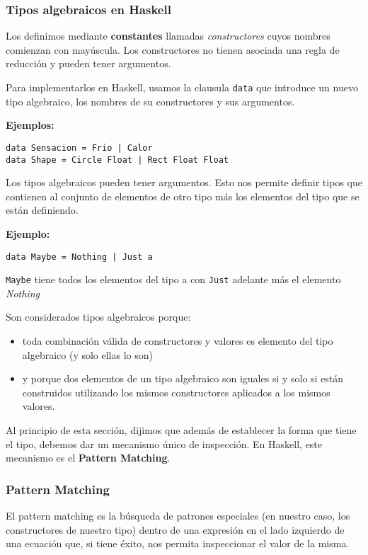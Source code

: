 \subsubsection{Tipos algebraicos en Haskell}
Los definimos mediante \textbf{constantes} llamadas \textit{constructores} cuyos nombres comienzan con mayúscula. Los constructores no tienen asociada una regla de reducción y pueden tener argumentos.

Para implementarlos en Haskell, usamos la clausula \texttt{data} que introduce un nuevo tipo algebraico, los nombres de su constructores y sus argumentos.

\textbf{Ejemplos:}
\begin{centrado}
	\begin{verbatim}
data Sensacion = Frio | Calor
data Shape = Circle Float | Rect Float Float
	\end{verbatim}
\end{centrado}

Los tipos algebraicos pueden tener argumentos. Esto nos permite definir tipos que contienen al conjunto de elementos de otro tipo más los elementos del tipo que se están definiendo.

\textbf{Ejemplo:}
\begin{centrado}
	\begin{verbatim}
data Maybe = Nothing | Just a
	\end{verbatim}
\end{centrado}
\texttt{Maybe} tiene todos los elementos del tipo a con \texttt{Just} adelante más el elemento \textit{Nothing}

\vspace*{5mm}

Son considerados tipos algebraicos porque:
\begin{itemize}
	\item toda combinación válida de constructores y valores es elemento del tipo algebraico (y solo ellas lo son)
	\item y porque dos elementos de un tipo algebraico son iguales si y solo si están construidos utilizando los mismos constructores aplicados a los mismos valores.
\end{itemize}
Al principio de esta sección, dijimos que además de establecer la forma que tiene el tipo, debemos dar un mecanismo único de inspección. En Haskell, este mecanismo es el \textbf{Pattern Matching}.


\subsubsection{Pattern Matching}
El pattern matching es la búsqueda de patrones especiales (en nuestro caso, los constructores de nuestro tipo) dentro de una expresión en el lado izquierdo de una ecuación que, si tiene éxito, nos permita inspeccionar el valor de la misma.

